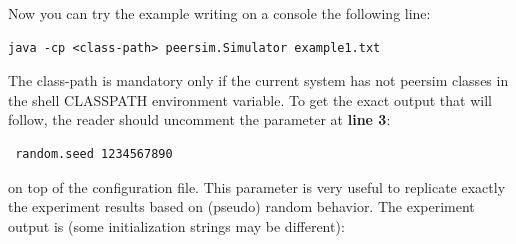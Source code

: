 \documentclass[a4paper,11pt]{article}
\begin{document}
Now you can try the example writing on a console the following line:

\begin{verbatim}
java -cp <class-path> peersim.Simulator example1.txt \end{verbatim}

The class-path is mandatory only if the current system has not peersim
classes in the shell CLASSPATH environment variable. To get the exact
output that will follow, the reader should uncomment the parameter
at \textbf{line 3}:

\begin{verbatim} random.seed 1234567890 \end{verbatim}

on top of the configuration file. This parameter is very useful to
replicate exactly the experiment results based on (pseudo) random
behavior. The experiment output is (some initialization strings may
be different):
\end{document}
